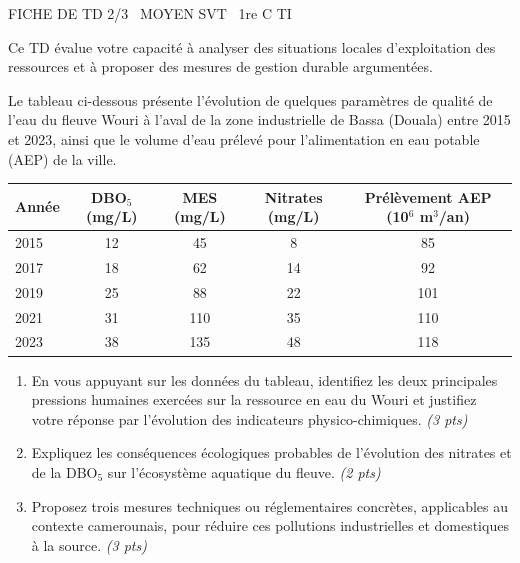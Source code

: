 \documentclass[11pt]{article}
\begin{document}
\begin{tcolorbox}[enhanced,colback=popink,colframe=popink,arc=10pt,boxrule=0pt,left=12pt,right=12pt,top=9pt,bottom=9pt]
{\color{white}\popxbold\small FICHE DE TD 2/3 \textbullet\ MOYEN \hfill SVT \textbullet\ 1re C TI\par}
\end{tcolorbox}
\vspace{4pt}
Ce TD évalue votre capacité à analyser des situations locales d'exploitation des ressources et à proposer des mesures de gestion durable argumentées.

\begin{exercice}
\label{exo:eau_douala}
Le tableau ci-dessous présente l'évolution de quelques paramètres de qualité de l'eau du fleuve Wouri à l'aval de la zone industrielle de Bassa (Douala) entre 2015 et 2023, ainsi que le volume d'eau prélevé pour l'alimentation en eau potable (AEP) de la ville.

\begin{tabular}{lcccc}
\toprule
Année & DBO$_5$ (mg/L) & MES (mg/L) & Nitrates (mg/L) & Prélèvement AEP (10$^6$ m$^3$/an) \\
\midrule
2015 & 12 & 45 & 8 & 85 \\
2017 & 18 & 62 & 14 & 92 \\
2019 & 25 & 88 & 22 & 101 \\
2021 & 31 & 110 & 35 & 110 \\
2023 & 38 & 135 & 48 & 118 \\
\bottomrule
\end{tabular}

\begin{enumerate}
    \item En vous appuyant sur les données du tableau, identifiez les deux principales pressions humaines exercées sur la ressource en eau du Wouri et justifiez votre réponse par l'évolution des indicateurs physico-chimiques. \textit{(3 pts)}
    \item Expliquez les conséquences écologiques probables de l'évolution des nitrates et de la DBO$_5$ sur l'écosystème aquatique du fleuve. \textit{(2 pts)}
    \item Proposez trois mesures techniques ou réglementaires concrètes, applicables au contexte camerounais, pour réduire ces pollutions industrielles et domestiques à la source. \textit{(3 pts)}
\end{enumerate}
\end{exercice}
\end{document}
